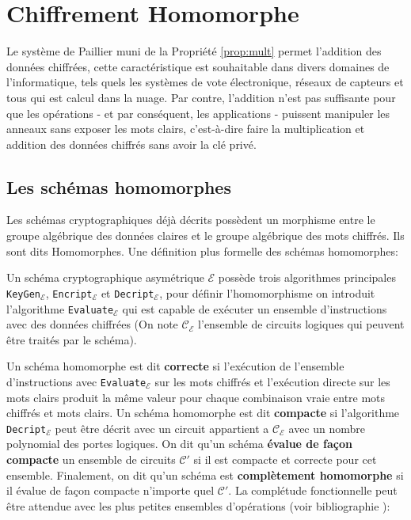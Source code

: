 \chapter{Chiffrement Homomorphe}

Le système de Paillier muni de la Propriété \ref{prop:mult} permet l'addition des données chiffrées,
cette caractéristique est souhaitable dans divers domaines de l'informatique, tels quels les systèmes
de vote électronique, réseaux de capteurs et tous qui est calcul dans la nuage. Par contre, 
l'addition n'est pas suffisante pour que les opérations - et par conséquent, les applications - puissent
manipuler les anneaux sans exposer les mots clairs, c'est-à-dire faire la multiplication 
et addition des données chiffrés sans avoir la clé privé.


\section{Les schémas homomorphes}


Les schémas cryptographiques déjà décrits possèdent un morphisme entre le groupe algébrique 
des données claires et le groupe algébrique des mots chiffrés. Ils sont dits Homomorphes.
Une définition plus formelle des schémas homomorphes:

Un schéma cryptographique asymétrique $\mathcal{E}$ possède trois algorithmes principales 
\verb!KeyGen!$_\mathcal{E}$, \verb!Encript!$_\mathcal{E}$ et \verb!Decript!$_\mathcal{E}$, pour définir l'homomorphisme on introduit l'algorithme
\verb!Evaluate!$_\mathcal{E}$ qui est capable de exécuter un ensemble d'instructions avec des données chiffrées 
(On note $\mathcal{C}_\mathcal{E}$ l'ensemble de circuits 
logiques qui peuvent être traités par le schéma).

Un schéma homomorphe est dit {\bf correcte} si l'exécution de l'ensemble d'instructions avec \verb!Evaluate!$_\mathcal{E}$ sur les 
mots chiffrés et l'exécution directe sur les mots clairs produit la même valeur pour chaque combinaison vraie 
entre mots chiffrés et mots clairs. Un schéma homomorphe est dit {\bf compacte} si l'algorithme \verb!Decript!$_\mathcal{E}$ 
peut être décrit avec un circuit appartient a $\mathcal{C}_\mathcal{E}$ avec un nombre polynomial des portes logiques.
On dit qu'un schéma {\bf évalue de façon compacte} un ensemble de circuits $\mathcal{C}'$ si il est compacte et 
correcte pour cet ensemble. Finalement, on dit qu'un schéma est {\bf complètement homomorphe} si il évalue de façon 
compacte n'importe quel $\mathcal{C}'$. La complétude fonctionnelle peut être attendue avec les plus petites ensembles 
d'opérations (voir bibliographie \cite{wernick1942complete}):

